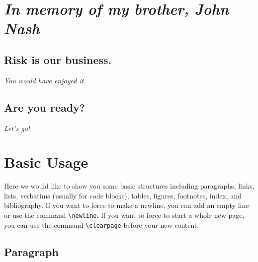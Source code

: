 \documentclass[10pt, a4paper, oneside]{article}
\begin{document}
\puredocTitlepageDate{\today}
\puredocTitlepageMaketitle[left]
\setcounter{page}{2}


{
\pagestyle{empty}
\vspace*{1cm}
\section*{\centering \emph{In memory of my brother, John Nash}}
\subsection*{\centering Risk is our business.}

{\centering \emph{You would have enjoyed it.} \par}


\subsection*{\centering Are you ready?}

{\centering \emph{Let's go!} \par}


\clearpage
}

\setcounter{tocdepth}{3}
{ \hypersetup{hidelinks} \tableofcontents } \clearpage
{ \hypersetup{hidelinks} \listoftables } \clearpage
{ \hypersetup{hidelinks} \listoffigures } \clearpage

\section{Basic Usage}\label{basic-usage}

Here we would like to show you some basic structures
including paragraphs, links, lists, verbatims (usually for code blocks),
tables, figures, footnotes, index, and bibliography.
If you want to force to make a newline, you can add an empty line or use the command \texttt{\textbackslash{}newline}.
If you want to force to start a whole new page, you can use the command \texttt{\textbackslash{}clearpage} before your new content.

\subsection{\texorpdfstring{Paragraph \label{start-paragraph}}{Paragraph }}\label{paragraph}
\end{document}
